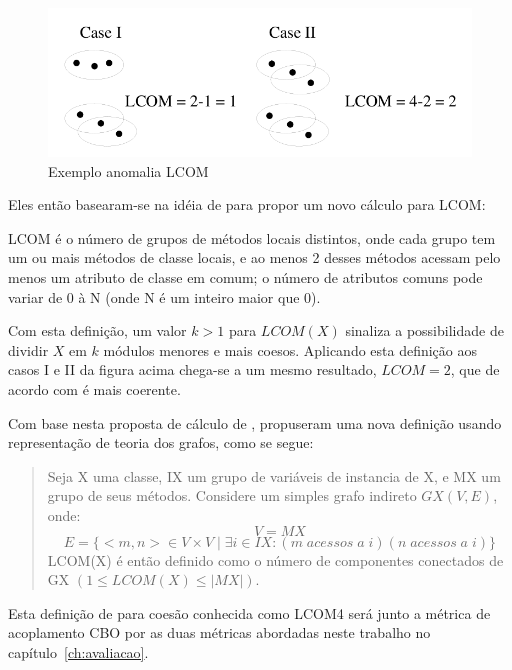 \begin{figure}[h]
\center
\includegraphics[scale=0.4]{imagens/exemplo-anomalia-lcom1-hitz-e-montazeri}
\caption{Exemplo anomalia LCOM \cite{measuringCouplingAndCohesion}}
\label{fig:exemplo-anomalia-lcom1}
\end{figure}

Eles então basearam-se na idéia de
 para propor um novo cálculo para
LCOM:

\begin{citacao}
LCOM é o número de grupos de métodos locais distintos, onde cada grupo tem um
ou mais métodos de classe locais, e ao menos 2 desses métodos acessam pelo
menos um atributo de classe em comum; o número de atributos comuns pode variar
de 0 à N (onde N é um inteiro maior que 0).
\cite{principalComponentAnalysisOfLCOM}
\end{citacao}

Com esta definição, um valor $k > 1$ para $LCOM(X)$ sinaliza a possibilidade de
dividir $X$ em $k$ módulos menores e mais coesos. Aplicando esta definição aos
casos I e II da figura acima chega-se a um mesmo resultado, $LCOM = 2$, que de
acordo com  é mais coerente.

Com base nesta proposta de cálculo de
,
 propuseram uma nova definição usando
representação de teoria dos grafos, como se segue:

\begin{quotation}
Seja X uma classe, IX um grupo de variáveis de instancia de X, e MX um grupo
de seus métodos. Considere um simples grafo indireto $GX(V, E)$, onde: $$V =
MX$$ $$E = \{<m, n> \in V \times V \mid \exists i \in IX: (m \; acessos \; a \;
i) (n \; acessos \; a \; i)\}$$ LCOM(X) é então definido como o número de componentes
conectados de GX $(1 \leq LCOM(X) \leq |MX|)$.
\end{quotation}

Esta definição de  para coesão
conhecida como LCOM4 será junto a métrica de acoplamento CBO por
 as duas métricas abordadas neste trabalho no
capítulo~\ref{ch:avaliacao}.

